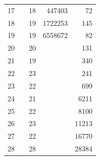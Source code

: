 \documentclass{article}
\begin{document}
\begin{table}[h]
\begin{tabular}{r|rrrr}
        17                                    &                                 & 18                              & 447403                          & 72                               \\
        18                                    &                                 & 19                              & 1722253                         & 145                              \\
        19                                    &                                 & 19                              & 6558672                         & 82                               \\
        20                                    &                                 & 20                              &                                 & 131                              \\
        21                                    &                                 & 19                              &                                 & 340                              \\
        22                                    &                                 & 23                              &                                 & 241                              \\
        23                                    &                                 & 22                              &                                 & 699                              \\
        24                                    &                                 & 21                              &                                 & 6211                             \\
        25                                    &                                 & 22                              &                                 & 8100                             \\
        26                                    &                                 & 23                              &                                 & 11213                            \\
        27                                    &                                 & 22                              &                                 & 16770                            \\
        28                                    &                                 & 28                              &                                 & 28384                            \\

\end{tabular}
\end{table}
\end{document}
